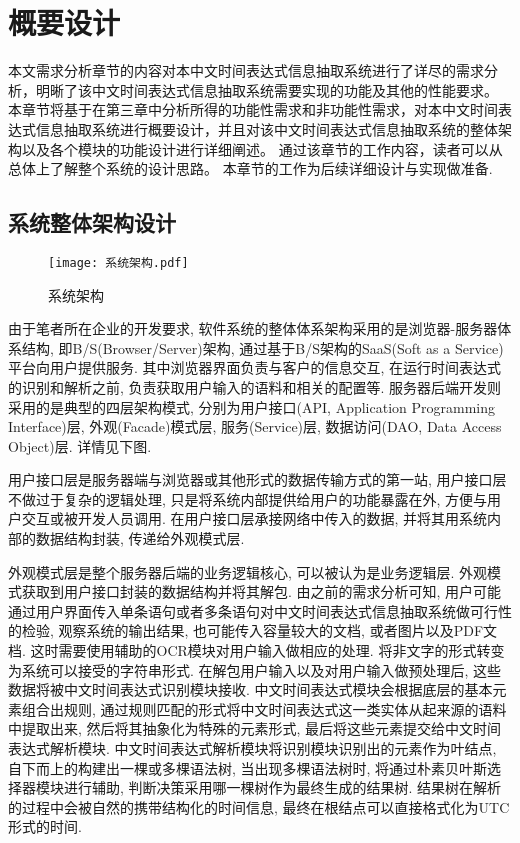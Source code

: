 

\chapter{概要设计}

本文需求分析章节的内容对本中文时间表达式信息抽取系统进行了详尽的需求分析，明晰了该中文时间表达式信息抽取系统需要实现的功能及其他的性能要求。
本章节将基于在第三章中分析所得的功能性需求和非功能性需求，对本中文时间表达式信息抽取系统进行概要设计，并且对该中文时间表达式信息抽取系统的整体架构以及各个模块的功能设计进行详细阐述。
通过该章节的工作内容，读者可以从总体上了解整个系统的设计思路。
本章节的工作为后续详细设计与实现做准备.

\section{系统整体架构设计}

\begin{figure}[h]
  \centering
  \texttt{[image: 系统架构.pdf]}
  \caption{系统架构}
  \label{fig:architect}
\end{figure}

由于笔者所在企业的开发要求, 软件系统的整体体系架构采用的是浏览器-服务器体系结构, 即B/S(Browser/Server)架构, 通过基于B/S架构的SaaS(Soft as a Service)平台向用户提供服务.
其中浏览器界面负责与客户的信息交互, 在运行时间表达式的识别和解析之前, 负责获取用户输入的语料和相关的配置等.
服务器后端开发则采用的是典型的四层架构模式, 分别为用户接口(API, Application Programming Interface)层, 外观(Facade)模式层, 服务(Service)层, 数据访问(DAO, Data Access Object)层. 详情见下图.

用户接口层是服务器端与浏览器或其他形式的数据传输方式的第一站, 用户接口层不做过于复杂的逻辑处理, 只是将系统内部提供给用户的功能暴露在外, 方便与用户交互或被开发人员调用.
在用户接口层承接网络中传入的数据, 并将其用系统内部的数据结构封装, 传递给外观模式层.

外观模式层是整个服务器后端的业务逻辑核心, 可以被认为是业务逻辑层. 外观模式获取到用户接口封装的数据结构并将其解包.
由之前的需求分析可知, 用户可能通过用户界面传入单条语句或者多条语句对中文时间表达式信息抽取系统做可行性的检验, 观察系统的输出结果,
也可能传入容量较大的文档, 或者图片以及PDF文档. 这时需要使用辅助的OCR模块对用户输入做相应的处理. 将非文字的形式转变为系统可以接受的字符串形式.
在解包用户输入以及对用户输入做预处理后, 这些数据将被中文时间表达式识别模块接收.
中文时间表达式模块会根据底层的基本元素组合出规则, 通过规则匹配的形式将中文时间表达式这一类实体从起来源的语料中提取出来, 然后将其抽象化为特殊的元素形式, 最后将这些元素提交给中文时间表达式解析模块.
中文时间表达式解析模块将识别模块识别出的元素作为叶结点, 自下而上的构建出一棵或多棵语法树, 当出现多棵语法树时, 将通过朴素贝叶斯选择器模块进行辅助, 判断决策采用哪一棵树作为最终生成的结果树.
结果树在解析的过程中会被自然的携带结构化的时间信息, 最终在根结点可以直接格式化为UTC形式的时间.

